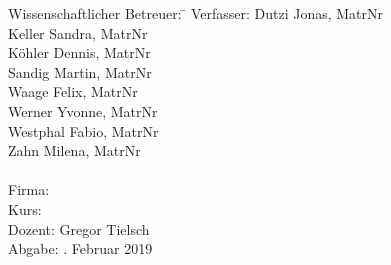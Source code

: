 \begin{titlepage}
\begin{center}
\begin{minipage}{\textwidth}
\begin{tabbing}
	Wissenschaftlicher Betreuer: \hspace{0.35cm}\=\kill
	Verfasser: 
		\> Dutzi Jonas, MatrNr \\
		\> Keller Sandra, MatrNr \\
		\> Köhler Dennis, MatrNr \\
		\> Sandig Martin, MatrNr \\
		\> Waage Felix, MatrNr \\
		\> Werner Yvonne, MatrNr \\
		\> Westphal Fabio, MatrNr \\
		\> Zahn Milena, MatrNr \\\\
	Firma: \> \DerNameDerFirma  \\[1.5mm]
	Kurs: \> \DieKursbezeichnung \\[1.5mm]
	Dozent: \> Gregor Tielsch \\[1.5mm]
	Abgabe: . Februar 2019
\end{tabbing}
\end{minipage}

\end{center}

\end{titlepage}